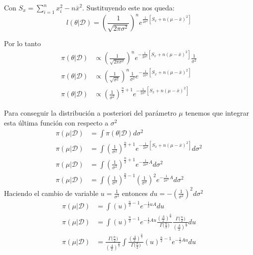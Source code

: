 \documentclass[12pt,]{article}
\begin{document}
Con \(S_x=\sum_{i=1}^n x_i^2 - n\bar x^2\). Sustituyendo este nos queda:
\[l(\theta|\mathcal{D})= \left( \frac{1}{\sqrt{2\pi\sigma^2}}\right)^n e^{\frac{1}{2\sigma^2}\left[ S_x + n(\mu-\bar x)^2\right]}\]

Por lo tanto \[
\begin{array}{rl}
\pi(\theta|\mathcal{D}) & \propto \left( \frac{1}{\sqrt{2\pi\sigma^2}}\right)^n e^{-\frac{1}{2\sigma^2}\left[ S_x + n(\mu-\bar x)^2\right]}\frac{1}{\sigma^2}\\
\pi(\theta|\mathcal{D}) & \propto \left( \frac{1}{\sqrt{\sigma^2}}\right)^n \frac{1}{\sigma^2} e^{-\frac{1}{2\sigma^2}\left[ S_x + n(\mu-\bar x)^2\right]}\\
\pi(\theta|\mathcal{D}) & \propto \left( \frac{1}{\sigma^2}\right)^{\frac{n}{2}+1}  e^{-\frac{1}{2\sigma^2}\left[ S_x + n(\mu-\bar x)^2\right]}
\end{array}
\]

Para conseguir la distribución a posteriori del parámetro \(\mu\)
tenemos que integrar esta última función con respecto a \(\sigma^2\) \[
\begin{array}{rl}
\pi(\mu|\mathcal{D}) & = \displaystyle \int \pi(\theta|\mathcal{D}) d\sigma^2\\
\pi(\mu|\mathcal{D}) & = \displaystyle \int \left( \frac{1}{\sigma^2}\right)^{\frac{n}{2}+1}  e^{-\frac{1}{2\sigma^2}\left[ S_x + n(\mu-\bar x)^2\right]}d\sigma^2\\
\pi(\mu|\mathcal{D}) & = \displaystyle \int \left( \frac{1}{\sigma^2}\right)^{\frac{n}{2}+1}e^{-\frac{1}{2\sigma^2}A}d\sigma^2\\
\pi(\mu|\mathcal{D}) & = \displaystyle \int \left( \frac{1}{\sigma^2}\right)^{\frac{n}{2}-1}\left( \frac{1}{\sigma^2}\right)^{2}e^{-\frac{1}{2\sigma^2}A}d\sigma^2
\end{array}
\] Haciendo el cambio de variable \(u=\frac{1}{\sigma^2}\) entonces
\(du=-\left(\frac{1}{\sigma^2}\right)^2 d\sigma^2\) \[
\begin{array}{rl}
\pi(\mu|\mathcal{D}) & = \displaystyle \int (u)^{\frac{n}{2}-1}e^{-\frac{1}{2}uA}du\\
\pi(\mu|\mathcal{D}) & = \displaystyle \int (u)^{\frac{n}{2}-1}e^{-\frac{1}{2}Au}\frac{(\frac{A}{2})^{\frac{n}{2}}}{\Gamma{(\frac{n}{2}})}\frac{\Gamma{(\frac{n}{2}})}{(\frac{A}{2})^{\frac{n}{2}}}du\\
\pi(\mu|\mathcal{D}) & = \displaystyle \frac{\Gamma{(\frac{n}{2}})}{(\frac{A}{2})^{\frac{n}{2}}} \int \frac{(\frac{A}{2})^{\frac{n}{2}}}{\Gamma{(\frac{n}{2}})} (u)^{\frac{n}{2}-1}e^{-\frac{1}{2}Au}du\\
\end{array}
\]
\end{document}
